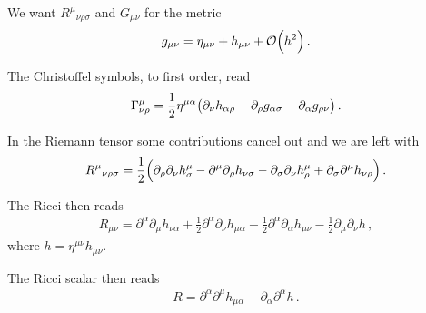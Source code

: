 \documentclass[main.tex]{subfiles}
\begin{document}

We want \(R^{\mu }{}_{\nu \rho \sigma }\) and \(G_{\mu \nu }\)  for the metric 
%
\begin{align}
g_{\mu \nu } = \eta_{\mu \nu } + h_{\mu \nu } + \order{h^2}
\,.
\end{align}

The Christoffel symbols, to first order, read 
%
\begin{align}
\Gamma^{\mu }_{\nu \rho } = \frac{1}{2} \eta^{\mu \alpha} 
\qty( \partial_{\nu } h_{\alpha \rho } + \partial_{\rho } g_{\alpha \sigma } - \partial_{\alpha } g_{\rho \nu })
\,.
\end{align}

In the Riemann tensor some contributions cancel out and we are left with 
%
\begin{align}
R^{\mu }{}_{\nu \rho \sigma } = \frac{1}{2} 
\qty(
    \partial_{\rho } \partial_{\nu } h^{\mu }_{\sigma } - \partial^{\mu } \partial_{\rho } h_{\nu \sigma } 
    - \partial_{\sigma } \partial_{\nu } h^{\mu }_{\rho } 
    + \partial_{\sigma } \partial^{\mu } h_{\nu \rho }
)
\,.
\end{align}

The Ricci then reads 
%
\begin{align}
R_{\mu \nu } = \partial^{\alpha } \partial_{\mu } h_{\nu \alpha }
+ \frac{1}{2} \partial^{\alpha } \partial_{\nu } h_{\mu \alpha } 
- \frac{1}{2} \partial^{\alpha } \partial_{\alpha } h_{\mu \nu } 
- \frac{1}{2} \partial_{\mu } \partial_{\nu } h
\,,
\end{align}
%
where \(h = \eta^{\mu \nu } h_{\mu \nu }\). 

The Ricci scalar then reads 
%
\begin{align}
R = \partial^{\alpha } \partial^{\mu } h_{\mu \alpha } - \partial_{\alpha } \partial^{\alpha } h
\,.
\end{align}
\end{document}
